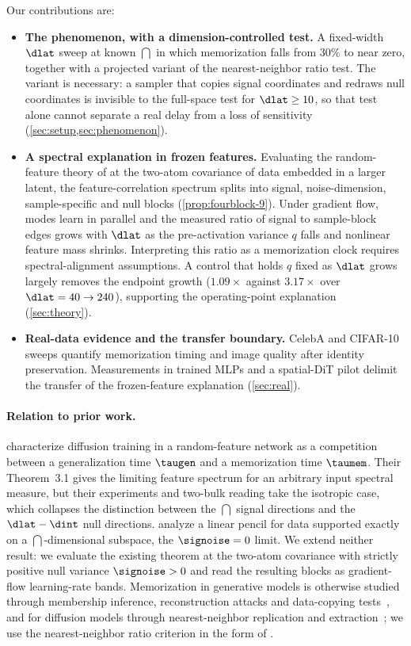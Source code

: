 Our contributions are:
\begin{itemize}
  \item \textbf{The phenomenon, with a dimension-controlled test.} A fixed-width $\dlat$ sweep at known $\dint$ in which memorization falls from $30\%$ to near zero, together with a projected variant of the nearest-neighbor ratio test. The variant is necessary: a sampler that copies signal coordinates and redraws null coordinates is invisible to the full-space test for $\dlat\ge10$, so that test alone cannot separate a real delay from a loss of sensitivity (\cref{sec:setup,sec:phenomenon}).
  \item \textbf{A spectral explanation in frozen features.} Evaluating the random-feature theory of \citet{bonnaire2025} at the two-atom covariance of data embedded in a larger latent, the feature-correlation spectrum splits into signal, noise-dimension, sample-specific and null blocks (\cref{prop:fourblock-9}). Under gradient flow, modes learn in parallel and the measured ratio of signal to sample-block edges grows with $\dlat$ as the pre-activation variance $q$ falls and nonlinear feature mass shrinks. Interpreting this ratio as a memorization clock requires spectral-alignment assumptions. A control that holds $q$ fixed as $\dlat$ grows largely removes the endpoint growth ($1.09\times$ against $3.17\times$ over $\dlat=40\to240$), supporting the operating-point explanation (\cref{sec:theory}).
  \item \textbf{Real-data evidence and the transfer boundary.} CelebA and CIFAR-10 sweeps quantify memorization timing and image quality after identity preservation. Measurements in trained MLPs and a spatial-DiT pilot delimit the transfer of the frozen-feature explanation (\cref{sec:real}).
\end{itemize}

\paragraph{Relation to prior work.}
\citet{bonnaire2025} characterize diffusion training in a random-feature network as a competition between a generalization time $\taugen$ and a memorization time $\taumem$. Their Theorem~3.1 gives the limiting feature spectrum for an arbitrary input spectral measure, but their experiments and two-bulk reading take the isotropic case, which collapses the distinction between the $\dint$ signal directions and the $\dlat-\dint$ null directions. \citet{george2025dsm} analyze a linear pencil for data supported exactly on a $\dint$-dimensional subspace, the $\signoise=0$ limit. We extend neither result: we evaluate the existing theorem at the two-atom covariance with strictly positive null variance $\signoise>0$ and read the resulting blocks as gradient-flow learning-rate bands. Memorization in generative models is otherwise studied through membership inference, reconstruction attacks and data-copying tests~\citep{hayes2017logan,hilprecht2019reconstruction,meehan2020datacopying}, and for diffusion models through nearest-neighbor replication and extraction~\citep{somepalli2023diffusion,carlini2023extracting}; we use the nearest-neighbor ratio criterion in the form of \citet{bonnaire2025}.
